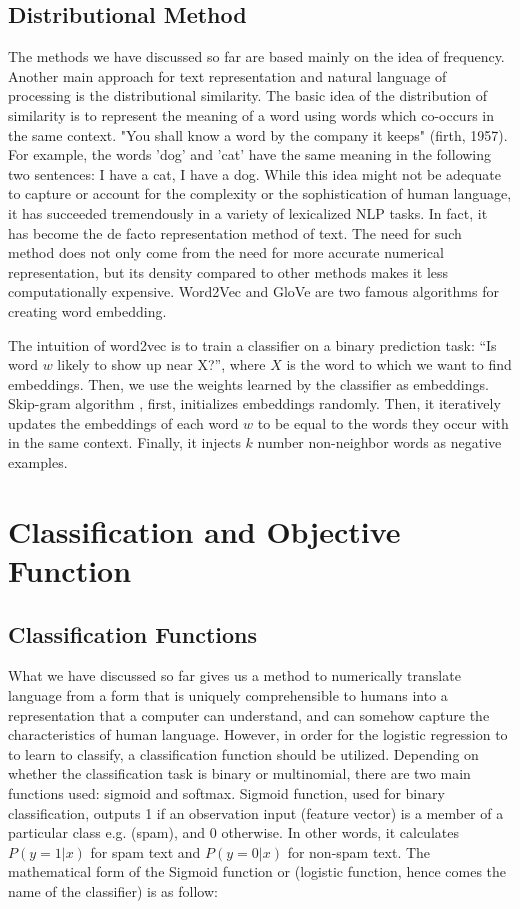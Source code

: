 \subsection{Distributional Method}
The methods we have discussed so far are based mainly on the idea of frequency. Another main approach for text representation and natural language of processing is the distributional similarity. The basic idea of the distribution of similarity is to represent the meaning of a word using words which co-occurs in the same context. "You shall know a word by the company it keeps" \citep{firth1957synopsis}(firth, 1957). For example, the words 'dog' and 'cat' have the same meaning in the following two sentences: I have a cat, I have a dog. While this idea might not be adequate to capture or account for the complexity or the sophistication of human language, it has succeeded tremendously in a variety of lexicalized NLP tasks. In fact, it has become the de facto representation method of text. The need for such method does not only come from the need for more accurate numerical representation, but its density compared to other methods makes it less computationally expensive. Word2Vec \citep{mikolov2013distributed} and GloVe \citep{pennington2014glove} are two famous algorithms for creating word embedding. 

The intuition of word2vec is to train a classifier on a binary prediction task: “Is
word $w$ likely to show up near X?”, where $X$ is the word to which we want to find embeddings. Then, we use the weights learned by the classifier as embeddings. Skip-gram algorithm \citep{mikolov2013distributed} , first, initializes embeddings randomly. Then, it iteratively updates the embeddings of each word $w$ to be equal to the words they occur with in the same context. Finally, it injects $k$ number non-neighbor words as negative examples. 

\section{Classification and Objective Function}
\subsection{Classification Functions}
What we have discussed so far gives us a method to numerically translate language from a form that is uniquely comprehensible to humans into a representation that a computer can understand, and can somehow capture the characteristics of human language. However, in order for the logistic regression to to learn to classify, a classification function should be utilized. Depending on whether the classification task is binary or multinomial, there are two main functions used: sigmoid and softmax. Sigmoid function, used for binary classification, outputs 1 if an observation input (feature vector) is a member of a particular class e.g. (spam), and 0 otherwise. In other words, it calculates $P(y=1|x)$ for spam text and $P(y=0|x)$ for non-spam text. The mathematical form of the Sigmoid function or (logistic function, hence comes the name of the classifier) is as follow:

